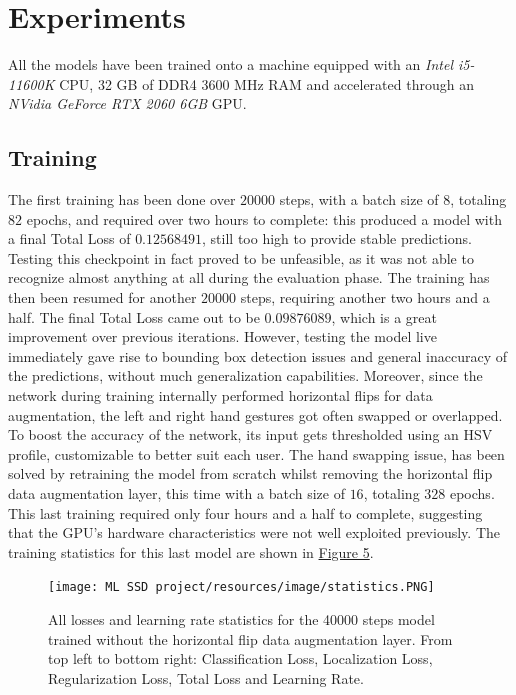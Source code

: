 \documentclass[10pt,twocolumn,letterpaper]{article}
\begin{document}
\section{Experiments}
\begin{flushleft}
All the models have been trained onto a machine equipped with an \textit{Intel i5-11600K} CPU, 32 GB of DDR4 3600 MHz RAM and accelerated through an \textit{NVidia GeForce RTX 2060 6GB} GPU.
\end{flushleft}
\subsection{Training}
\begin{flushleft}
The first training has been done over $20000$ steps, with a batch size of $8$, totaling $82$ epochs, and required over two hours to complete: this produced a model with a final Total Loss of $0.12568491$, still too high to provide stable predictions. Testing this checkpoint in fact proved to be unfeasible, as it was not able to recognize almost anything at all during the evaluation phase.
The training has then been resumed for another $20000$ steps, requiring another two hours and a half. The final Total Loss came out to be $0.09876089$, which is a great improvement over previous iterations. However, testing the model live immediately gave rise to bounding box detection issues and general inaccuracy of the predictions, without much generalization capabilities. Moreover, since the network during training internally performed horizontal flips for data augmentation, the left and right hand gestures got often swapped or overlapped. To boost the accuracy of the network, its input gets thresholded using an HSV profile, customizable to better suit each user.
The hand swapping issue, has been solved by retraining the model from scratch whilst removing the horizontal flip data augmentation layer, this time with a batch size of $16$, totaling $328$ epochs. This last training required only four hours and a half to complete, suggesting that the GPU's hardware characteristics were not well exploited previously.
The training statistics for this last model are shown in \hyperref[figure5]{Figure 5}.

\begin{figure}[!h]
    \centering
    \texttt{[image: ML SSD project/resources/image/statistics.PNG]} \caption{All losses and learning rate statistics for the 40000 steps model trained without the horizontal flip data augmentation layer. From top left to bottom right: Classification Loss, Localization Loss, Regularization Loss, Total Loss and Learning Rate.}
\end{figure}
\label{figure5}

\end{flushleft}
\end{document}
